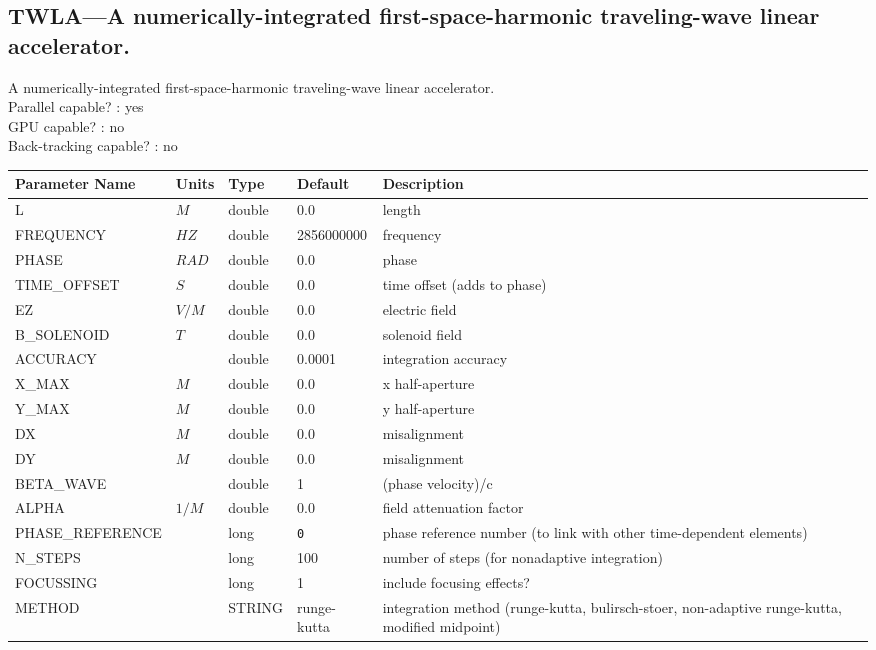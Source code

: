 \subsection{TWLA---A numerically-integrated first-space-harmonic traveling-wave linear accelerator.}
A numerically-integrated first-space-harmonic traveling-wave linear accelerator.
\\
Parallel capable? : yes\\
GPU capable? : no\\
Back-tracking capable? : no\\
\begin{tabular}{|l|l|l|l|p{\descwidth}|} \hline
Parameter Name & Units & Type & Default & Description \\ \hline 
L & $M$ & double &  0.0 & length  \\ \hline 
FREQUENCY & $HZ$ & double &   2856000000 & frequency  \\ \hline 
PHASE & $RAD$ & double &  0.0 & phase  \\ \hline 
TIME\_OFFSET & $S$ & double &  0.0 & time offset (adds to phase)  \\ \hline 
EZ & $V/M$ & double &  0.0 & electric field  \\ \hline 
B\_SOLENOID & $T$ & double &  0.0 & solenoid field  \\ \hline 
ACCURACY &  & double &   0.0001 & integration accuracy  \\ \hline 
X\_MAX & $M$ & double &  0.0 & x half-aperture  \\ \hline 
Y\_MAX & $M$ & double &  0.0 & y half-aperture  \\ \hline 
DX & $M$ & double &  0.0 & misalignment  \\ \hline 
DY & $M$ & double &  0.0 & misalignment  \\ \hline 
BETA\_WAVE &  & double &   1 & (phase velocity)/c  \\ \hline 
ALPHA & $1/M$ & double &  0.0 & field attenuation factor  \\ \hline 
PHASE\_REFERENCE &  & long &  \verb|0| & phase reference number (to link with other time-dependent elements)  \\ \hline 
N\_STEPS &  & long &   100             & number of steps (for nonadaptive integration)  \\ \hline 
FOCUSSING &  & long &   1               & include focusing effects?  \\ \hline 
METHOD & $ $ & STRING &   runge-kutta     & integration method (runge-kutta, bulirsch-stoer, non-adaptive runge-kutta, modified midpoint)  \\ \hline 

\end{tabular}
